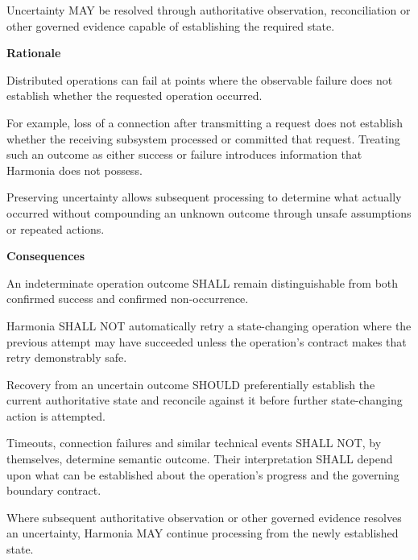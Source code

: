 Uncertainty MAY be resolved through authoritative observation, reconciliation or other governed evidence capable of establishing the required state.



\par\medskip\textbf{Rationale}\par


Distributed operations can fail at points where the observable failure does not establish whether the requested operation occurred.



For example, loss of a connection after transmitting a request does not establish whether the receiving subsystem processed or committed that request. Treating such an outcome as either success or failure introduces information that Harmonia does not possess.



Preserving uncertainty allows subsequent processing to determine what actually occurred without compounding an unknown outcome through unsafe assumptions or repeated actions.



\par\medskip\textbf{Consequences}\par


An indeterminate operation outcome SHALL remain distinguishable from both confirmed success and confirmed non-occurrence.



Harmonia SHALL NOT automatically retry a state-changing operation where the previous attempt may have succeeded unless the operation's contract makes that retry demonstrably safe.



Recovery from an uncertain outcome SHOULD preferentially establish the current authoritative state and reconcile against it before further state-changing action is attempted.



Timeouts, connection failures and similar technical events SHALL NOT, by themselves, determine semantic outcome. Their interpretation SHALL depend upon what can be established about the operation's progress and the governing boundary contract.



Where subsequent authoritative observation or other governed evidence resolves an uncertainty, Harmonia MAY continue processing from the newly established state.




